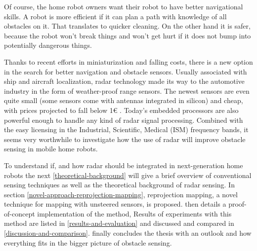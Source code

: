 Of course, the home robot owners want their robot to have better
navigational skills. A robot is more efficient if it can plan a path
with knowledge of all obstacles on it. That translates to quicker
cleaning. On the other hand it is safer, because the robot won't break
things and won't get hurt if it does not bump into potentially dangerous
things.

Thanks to recent efforts in miniaturization and falling costs, there is
a new option in the search for better navigation and obstacle sensors.
Usually associated with ship and aircraft localization, radar technology
made its way to the automotive industry in the form of weather-proof
range sensors. The newest sensors are even quite small (some sensors
come with antennas integrated in silicon) and cheap, with prices
projected to fall below 1€ \cite{Brouwer2015}. Today's embedded
processors are also powerful enough to handle any kind of radar signal
processing. Combined with the easy licensing in the Industrial,
Scientific, Medical (ISM) frequency bands, it seems very worthwhile to
investigate how the use of radar will improve obstacle sensing in mobile
home robots.

To understand if, and how radar should be integrated in next-generation
home robots the next \cref{theoretical-background} will give a brief overview of conventional
sensing techniques as well as the theoretical background of radar sensing. In section \cref{novel-approach-reprojection-mapping}, reprojection mapping, a novel technique for mapping with unsteered sensors, is proposed.  then details a proof-of-concept implementation of the method, Results of experiments with this method are listed in \cref{results-and-evaluation} and discussed and compared in \cref{discussion-and-comparison}.  finally concludes the thesis with an outlook and how everything fits in the bigger picture of obstacle sensing.